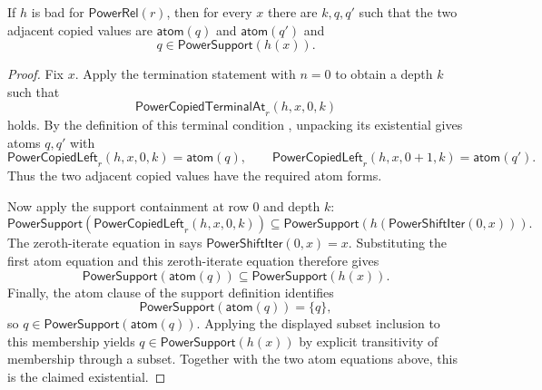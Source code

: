 \begin{lemma}
If $h$ is bad for $\mathsf{PowerRel}(r)$, then for every $x$ there are
$k,q,q'$ such that the two adjacent copied values are
$\mathsf{atom}(q)$ and $\mathsf{atom}(q')$ and
\[
q\in\mathsf{PowerSupport}(h(x)).
\]
\end{lemma}
\begin{proof}
Fix $x$.  Apply the termination statement
 with $n=0$ to obtain a depth $k$ such
that
\[
\mathsf{PowerCopiedTerminalAt}_r(h,x,0,k)
\]
holds.  By the definition of this terminal condition
, unpacking its existential gives atoms
$q,q'$ with
\[
\mathsf{PowerCopiedLeft}_r(h,x,0,k)=\mathsf{atom}(q),
\qquad
\mathsf{PowerCopiedLeft}_r(h,x,0+1,k)=\mathsf{atom}(q').
\]
Thus the two adjacent copied values have the required atom forms.

Now apply the support containment
 at row $0$ and depth $k$:
\[
\mathsf{PowerSupport}(\mathsf{PowerCopiedLeft}_r(h,x,0,k))
\subseteq
\mathsf{PowerSupport}(h(\mathsf{PowerShiftIter}(0,x))).
\]
The zeroth-iterate equation in  says
$\mathsf{PowerShiftIter}(0,x)=x$.  Substituting the first atom equation
and this zeroth-iterate equation therefore gives
\[
\mathsf{PowerSupport}(\mathsf{atom}(q))
\subseteq \mathsf{PowerSupport}(h(x)).
\]
Finally, the atom clause of the support definition 
identifies
\[
\mathsf{PowerSupport}(\mathsf{atom}(q))=\{q\},
\]
so $q\in\mathsf{PowerSupport}(\mathsf{atom}(q))$.  Applying the displayed
subset inclusion to this membership yields
$q\in\mathsf{PowerSupport}(h(x))$ by explicit transitivity of membership
through a subset.  Together with the two atom equations above, this is the
claimed existential.
\end{proof}
